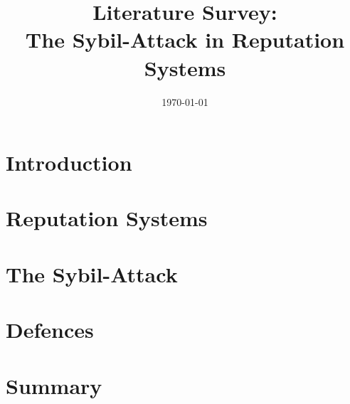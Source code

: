 \documentclass[12pt]{article}
\title{Literature Survey:\\The Sybil-Attack in Reputation Systems}
\date{\today}
\begin{document}
\maketitle
\begin{abstract}
\end{abstract}

\section{Introduction}


\section{Reputation Systems}\label{sec:reputation}


\section{The Sybil-Attack}\label{sec:sybil}


\section{Defences}\label{sec:defences}


\section{Summary}

\printbibliography
\end{document}
